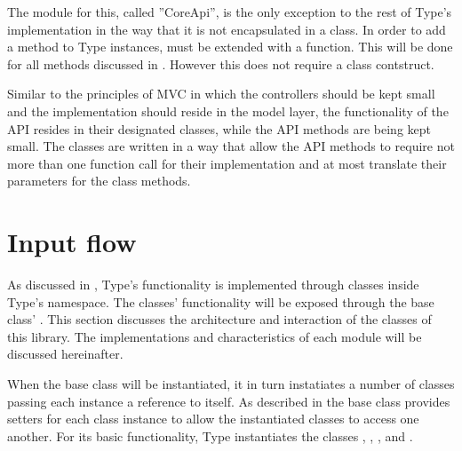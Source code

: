 The module for this, called ''CoreApi'', is the only exception to the rest of Type's implementation in the way that it is not encapsulated in a class. In order to add a method to Type instances,  must be extended with a function. This will be done for all methods discussed in . However this does not require a class contstruct.

Similar to the principles of MVC in which the controllers should be kept small and the implementation should reside in the model layer, the functionality of the API resides in their designated classes, while the API methods are being kept small. The classes are written in a way that allow the API methods to require not more than one function call for their implementation and at most translate their parameters for the class methods.





\section{Input flow}
\label{sec:module_architecture}

As discussed in , Type's functionality is implemented through classes inside Type's namespace. The classes' functionality will be exposed through the base class' . This section discusses the architecture and interaction of the classes of this library. The implementations and characteristics of each module will be discussed hereinafter.

When the  base class will be instantiated, it in turn instatiates a number of classes passing each instance a reference to itself. As described in  the base class provides setters for each class instance to allow the instantiated classes to access one another. For its basic functionality, Type instantiates the classes , , ,  and .



